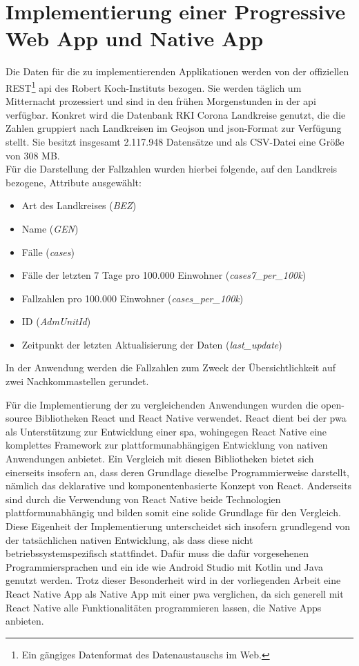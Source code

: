 \chapter{Implementierung einer Progressive Web App und Native App}\label{ch:implementation}
Die Daten für die zu implementierenden Applikationen werden von der offiziellen REST\footnote{Ein gängiges Datenformat des Datenaustauschs im Web.} \ac{api} des Robert Koch-Instituts bezogen.
Sie werden täglich um Mitternacht prozessiert und sind in den frühen Morgenstunden in der \ac{api} verfügbar.
Konkret wird die Datenbank \glqq RKI Corona Landkreise\grqq{} genutzt, die die Zahlen gruppiert nach Landkreisen im Geo\ac{json} und \ac{json}-Format zur Verfügung stellt.
Sie besitzt insgesamt 2.117.948 Datensätze und als CSV-Datei eine Größe von 308 MB\cite{COVID19Datenhub.2020}.\\
Für die Darstellung der Fallzahlen wurden hierbei folgende, auf den Landkreis bezogene, Attribute ausgewählt:
\begin{itemize}
\item Art des Landkreises (\textit{BEZ})
\item Name (\textit{GEN})
\item Fälle (\textit{cases})
\item Fälle der letzten 7 Tage pro 100.000 Einwohner (\textit{cases7\_per\_100k})
\item Fallzahlen pro 100.000 Einwohner (\textit{cases\_per\_100k})
\item ID (\textit{AdmUnitId})
\item Zeitpunkt der letzten Aktualisierung der Daten (\textit{last\_update})
\end{itemize}
In der Anwendung werden die Fallzahlen zum Zweck der Übersichtlichkeit auf zwei Nachkommastellen gerundet.

Für die Implementierung der zu vergleichenden Anwendungen wurden die open-source Bibliotheken React und React Native verwendet.
React dient bei der \ac{pwa} als Unterstützung zur Entwicklung einer \ac{spa}, wohingegen React Native eine komplettes Framework zur plattformunabhängigen Entwicklung von nativen Anwendungen anbietet.
Ein Vergleich mit diesen Bibliotheken bietet sich einerseits insofern an, dass deren Grundlage dieselbe Programmierweise darstellt, nämlich das deklarative und komponentenbasierte Konzept von React.
Anderseits sind durch die Verwendung von React Native beide Technologien plattformunabhängig und bilden somit eine solide Grundlage für den Vergleich.
Diese Eigenheit der Implementierung unterscheidet sich insofern grundlegend von der tatsächlichen nativen Entwicklung, als dass diese nicht betriebssystemspezifisch stattfindet.
Dafür muss die dafür vorgesehenen Programmiersprachen und ein \ac{ide} wie Android Studio mit Kotlin und Java genutzt werden.
Trotz dieser Besonderheit wird in der vorliegenden Arbeit eine React Native App als Native App mit einer \ac{pwa} verglichen, da sich generell mit React Native alle Funktionalitäten programmieren lassen, die Native Apps anbieten.

